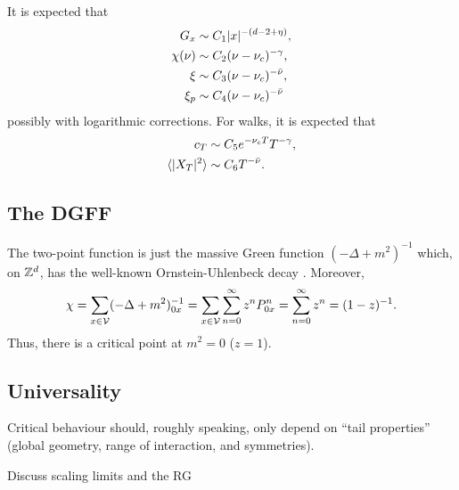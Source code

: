 It is expected that
\begin{align}
G_x       &\sim C_1 |x|^{-(d - 2 + \eta)}, \\
\chi(\nu) &\sim C_2 (\nu - \nu_c)^{-\gamma}, \\
\xi       &\sim C_3 (\nu - \nu_c)^{-\bar\nu}, \\
\xi_p     &\sim C_4 (\nu - \nu_c)^{-\bar\nu}
\end{align}
possibly with logarithmic corrections. For walks, it is expected that
\begin{align}
c_T                       &\sim C_5 e^{-\nu_c T} T^{-\gamma}, \\
\langle |X_T|^2 \rangle   &\sim C_6 T^{-\bar\nu}.
\end{align}


\subsection{The DGFF}

The two-point function is just the massive Green function
$(-\Delta + m^2)^{-1}$ which, on ${ {{\mathbb Z}}^d }$, has the well-known Ornstein-Uhlenbeck decay . Moreover,
\begin{equation}
\chi
  =
\sum_{x\in\mathcal{V}} (-\Delta + m^2)^{-1}_{0x}
  =
\sum_{x\in\mathcal{V}} \sum_{n=0}^\infty z^n P^n_{0x}
  =
\sum_{n=0}^\infty z^n
  =
(1 - z)^{-1}.
\end{equation}
Thus, there is a critical point at $m^2 = 0$ ($z = 1$).




\subsection{Universality}

Critical behaviour should, roughly speaking, only depend on ``tail properties''
(global geometry, range of interaction, and symmetries).

Discuss scaling limits and the RG


